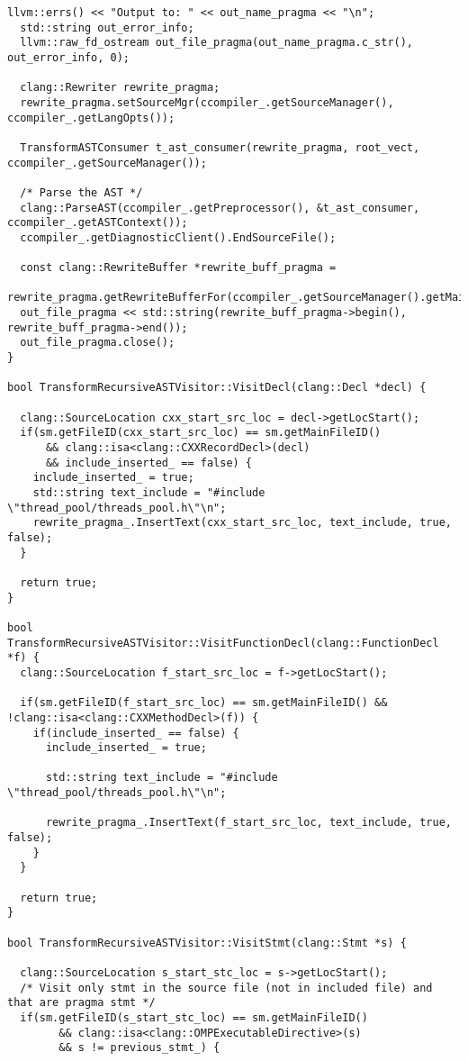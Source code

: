 \documentclass[a4paper,11pt,twoside]{book}
\begin{document}
\begin{lstlisting}[language=CCC, caption=driver/program.cpp]
  llvm::errs() << "Output to: " << out_name_pragma << "\n";
  std::string out_error_info;
  llvm::raw_fd_ostream out_file_pragma(out_name_pragma.c_str(), out_error_info, 0);  

  clang::Rewriter rewrite_pragma;
  rewrite_pragma.setSourceMgr(ccompiler_.getSourceManager(), ccompiler_.getLangOpts());

  TransformASTConsumer t_ast_consumer(rewrite_pragma, root_vect, ccompiler_.getSourceManager());
  
  /* Parse the AST */
  clang::ParseAST(ccompiler_.getPreprocessor(), &t_ast_consumer, ccompiler_.getASTContext());
  ccompiler_.getDiagnosticClient().EndSourceFile();

  const clang::RewriteBuffer *rewrite_buff_pragma = 
      rewrite_pragma.getRewriteBufferFor(ccompiler_.getSourceManager().getMainFileID());
  out_file_pragma << std::string(rewrite_buff_pragma->begin(), rewrite_buff_pragma->end());
  out_file_pragma.close();
}

bool TransformRecursiveASTVisitor::VisitDecl(clang::Decl *decl) {

  clang::SourceLocation cxx_start_src_loc = decl->getLocStart();
  if(sm.getFileID(cxx_start_src_loc) == sm.getMainFileID() 
      && clang::isa<clang::CXXRecordDecl>(decl)
      && include_inserted_ == false) {
    include_inserted_ = true;
    std::string text_include = "#include \"thread_pool/threads_pool.h\"\n";
    rewrite_pragma_.InsertText(cxx_start_src_loc, text_include, true, false);
  }

  return true;
}

bool TransformRecursiveASTVisitor::VisitFunctionDecl(clang::FunctionDecl *f) {     
  clang::SourceLocation f_start_src_loc = f->getLocStart();

  if(sm.getFileID(f_start_src_loc) == sm.getMainFileID() && !clang::isa<clang::CXXMethodDecl>(f)) {
    if(include_inserted_ == false) {
      include_inserted_ = true;

      std::string text_include = "#include \"thread_pool/threads_pool.h\"\n";

      rewrite_pragma_.InsertText(f_start_src_loc, text_include, true, false);
    }
  }

  return true;
}

bool TransformRecursiveASTVisitor::VisitStmt(clang::Stmt *s) {
  
  clang::SourceLocation s_start_stc_loc = s->getLocStart();
  /* Visit only stmt in the source file (not in included file) and that are pragma stmt */
  if(sm.getFileID(s_start_stc_loc) == sm.getMainFileID() 
        && clang::isa<clang::OMPExecutableDirective>(s) 
        && s != previous_stmt_) {
    

\end{lstlisting}
\end{document}
